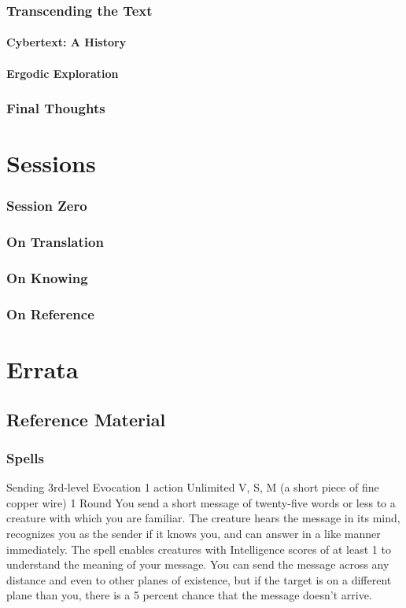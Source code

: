 \documentclass[10pt,twoside,twocolumn,openany,nomultitoc]{book}
\begin{document}
\section{Transcending the Text}
    \lipsum[6]
\subsection{Cybertext: A History}
    \lipsum[3]
\subsection{Ergodic Exploration}
    \lipsum[4]
\section{Final Thoughts}
    \lipsum[5]



\part{Sessions}
\section{Session Zero}
\section{On Translation}
    \lipsum[1]
\section{On Knowing}
    \lipsum[2]
\section{On Reference}
    \lipsum[3]
    
\part{Errata}
\chapter{Reference Material}

\section{Spells}
    \DndSpellHeader%
      {Sending}
      {3rd-level Evocation}
      {1 action}
      {Unlimited}
      {V, S, M (a short piece of fine copper wire)}
      {1 Round}
            You send a short message of twenty-five words or less to a creature with which you are familiar. The creature hears the message in its mind, recognizes you as the sender if it knows you, and can answer in a like manner immediately. The spell enables creatures with Intelligence scores of at least 1 to understand the meaning of your message.
            You can send the message across any distance and even to other planes of existence, but if the target is on a different plane than you, there is a 5 percent chance that the message doesn't arrive.
            
\end{document}
